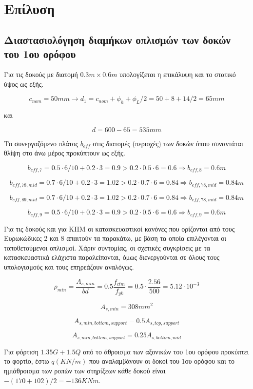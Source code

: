\pagestyle{fancy}
\chapter{Επίλυση}
\section{Διαστασιολόγηση διαμήκων οπλισμών των δοκών του 1ου ορόφου}
\noindent
Για τις δοκούς με διατομή $0.3m\times0.6m$ υπολογίζεται η επικάλυψη και το στατικό ύψος ως εξής.

\[
c_{nom} = 50 mm \rightarrow d_1 = c_{nom} + \phi_h + \phi_L/2 = 50 + 8 + 14/2 = 65 mm
\]

\noindent
και

\[
d = 600 - 65 = 535 mm
\]

\noindent
Το συνεργαζόμενο πλάτος \(b_{eff}\) στις διατομές (περιοχές) των δοκών όπου συναντάται θλίψη στο άνω μέρος προκύπτουν ως εξής.

\[
b_{eff,7} = 0.5\cdot6/10 + 0.2\cdot3 = 0.9 > 0.2\cdot0.5\cdot6 = 0.6 \Rightarrow b_{eff,8} = 0.6m
\]

\[
b_{eff,78,mid} = 0.7\cdot6/10 + 0.2\cdot3 = 1.02 > 0.2\cdot0.7\cdot6 = 0.84 \Rightarrow b_{eff,78,mid} = 0.84m
\]

\[
b_{eff,89,mid} = 0.7\cdot6/10 + 0.2\cdot3 = 1.02 > 0.2\cdot0.7\cdot6 = 0.84 \Rightarrow b_{eff,78,mid} = 0.84m
\]

\[
b_{eff,9} = 0.5\cdot6/10 + 0.2\cdot3 = 0.9 > 0.2\cdot0.5\cdot6 = 0.6 \Rightarrow b_{eff,9} = 0.6m
\]

\noindent
Για τις δοκούς και για ΚΠΜ οι κατασκευαστικοί κανόνες που ορίζονται από τους Ευρωκώδικες 2 και 8 απαιτούν τα παρακάτω, με βάση τα οποία επιλέγονται οι τοποθετούμενοι οπλισμοί. Χάριν συντομίας, οι σχετικές συγκρίσεις με τα κατασκευαστικά ελάχιστα παραλείπονται, όμως διενεργούνται σε όλους τους υπολογισμούς και τους επηρεάζουν αναλόγως.

\[
\rho_{min} = \dfrac{A_{s,min}}{bd} = 0.5\dfrac{f_{ctm}}{f_{yk}} = 0.5\cdot \dfrac{2.56}{500} = 5.12\cdot 10^{-3}
\]

\[
A_{s,min} = 308mm^2
\]

\[
A_{s,min,bottom,support} = 0.5A_{s,top,support}
\]

\[
A_{s,min,bottom,support} = 0.25A_{s,bottom,mid}
\]

\noindent
Για φόρτιση \(1.35G + 1.5Q\) από το άθροισμα των αξονικών του 1ου ορόφου προκύπτει το φορτίο, έστω $q (KN/m)$ που αναλαμβάνουν οι δοκοί του 1ου ορόφου και το ημιάθροισμα των ροπών των στηρίξεων κάθε δοκού είναι $-(170+102)/2= -136KNm$.

